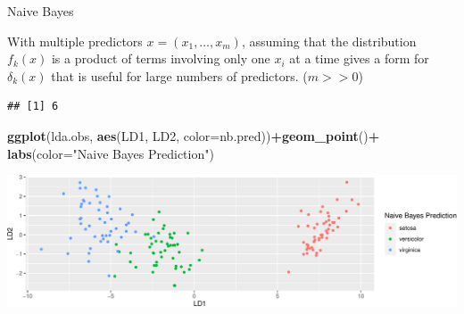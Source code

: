 \documentclass[
  ignorenonframetext,
]{beamer}
\newenvironment{Shaded}{\begin{snugshade}}{\end{snugshade}}
\newcommand{\DataTypeTok}[1]{\textcolor[rgb]{0.13,0.29,0.53}{#1}}
\newcommand{\KeywordTok}[1]{\textcolor[rgb]{0.13,0.29,0.53}{\textbf{#1}}}
\newcommand{\NormalTok}[1]{#1}
\newcommand{\OperatorTok}[1]{\textcolor[rgb]{0.81,0.36,0.00}{\textbf{#1}}}
\newcommand{\StringTok}[1]{\textcolor[rgb]{0.31,0.60,0.02}{#1}}
\begin{document}
\begin{frame}[fragile]{Naive Bayes}
\protect\hypertarget{naive-bayes}{}

With multiple predictors \(x=(x_1, \ldots, x_m)\), assuming that the
distribution \(f_k(x)\) is a product of terms involving only one \(x_i\)
at a time gives a form for \(\delta_k(x)\) that is useful for large
numbers of predictors. (\(m>>0\))

\scriptsize

\begin{Shaded}
\end{Shaded}

\begin{verbatim}
## [1] 6
\end{verbatim}

\begin{Shaded}
\begin{Highlighting}[]
\KeywordTok{ggplot}\NormalTok{(lda.obs, }\KeywordTok{aes}\NormalTok{(LD1, LD2, }\DataTypeTok{color=}\NormalTok{nb.pred))}\OperatorTok{+}\KeywordTok{geom_point}\NormalTok{()}\OperatorTok{+}
\StringTok{  }\KeywordTok{labs}\NormalTok{(}\DataTypeTok{color=}\StringTok{"Naive Bayes Prediction"}\NormalTok{)}
\end{Highlighting}
\end{Shaded}

\includegraphics{classify_files/figure-beamer/unnamed-chunk-9-1.pdf}

\end{frame}
\end{document}

